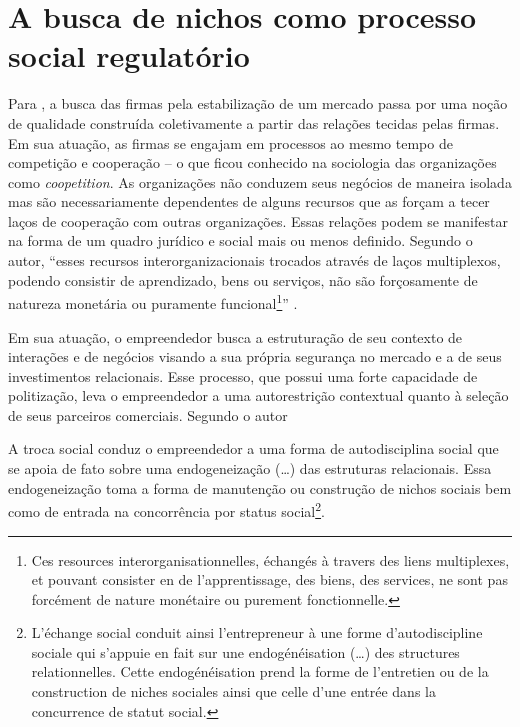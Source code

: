 \documentclass[a4paper, 12pt, openright, oneside, german, french, english, brazil]{abntex2}
\begin{document}



	
	\section{A busca de nichos como processo social regulatório}

	Para , a busca das firmas pela estabilização de um mercado passa por uma noção de qualidade construída coletivamente a partir das relações tecidas pelas firmas. Em sua atuação, as firmas se engajam em processos ao mesmo tempo de competição e cooperação -- o que ficou conhecido na sociologia das organizações como \textit{coopetition}. As organizações não conduzem seus negócios de maneira isolada mas são necessariamente dependentes de alguns recursos que as forçam a tecer laços de cooperação com outras organizações. Essas relações podem se manifestar na forma de um quadro jurídico e social mais ou menos definido. Segundo o autor, ``esses recursos interorganizacionais trocados através de laços multiplexos, podendo consistir de aprendizado, bens ou serviços, não são forçosamente de natureza monetária ou puramente funcional\footnote{Ces resources interorganisationnelles, échangés à travers des liens multiplexes, et pouvant consister en de l'apprentissage, des biens, des services, ne sont pas forcément de nature monétaire ou purement fonctionnelle.}'' \cite[p. 568]{lazega2009theorie}.

	Em sua atuação, o empreendedor busca a estruturação de seu contexto de interações e de negócios visando a sua própria segurança no mercado e a de seus investimentos relacionais. Esse processo, que possui uma forte capacidade de politização, leva o empreendedor a uma autorestrição contextual quanto à seleção de seus parceiros comerciais. Segundo o autor

	\begin{citacao}
	A troca social conduz o empreendedor a uma forma de autodisciplina social que se apoia de fato sobre uma endogeneização (\dots) das estruturas relacionais. Essa endogeneização toma a forma de manutenção ou construção de nichos sociais bem como de entrada na concorrência por status social\footnote{L'échange social conduit ainsi l'entrepreneur à une forme d'autodiscipline sociale qui s'appuie en fait sur une endogénéisation (\dots) des structures relationnelles. Cette endogénéisation prend la forme de l'entretien ou de la construction de niches sociales ainsi que celle d'une entrée dans la concurrence de statut social.}. \cite[p. 572]{lazega2009theorie}
	\end{citacao}
\end{document}
